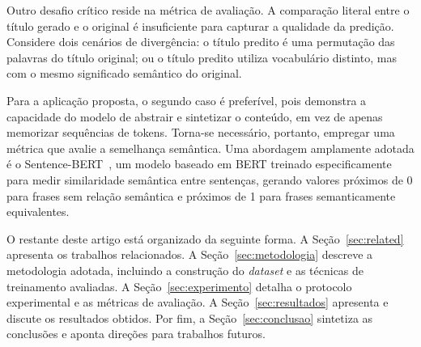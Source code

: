 Outro desafio crítico reside na métrica de avaliação. A comparação literal entre o título gerado e o original é insuficiente para capturar a qualidade da predição. Considere dois cenários de divergência: o título predito é uma permutação das palavras do título original; ou o título predito utiliza vocabulário distinto, mas com o mesmo significado semântico do original.

Para a aplicação proposta, o segundo caso é preferível, pois demonstra a capacidade do modelo de abstrair e sintetizar o conteúdo, em vez de apenas memorizar sequências de tokens. Torna-se necessário, portanto, empregar uma métrica que avalie a semelhança semântica. Uma abordagem amplamente adotada é o Sentence-BERT~\cite{reimers_sentence-bert_2019,devlin_bert_2019}, um modelo baseado em BERT treinado especificamente para medir similaridade semântica entre sentenças, gerando valores próximos de 0 para frases sem relação semântica e próximos de 1 para frases semanticamente equivalentes.

O restante deste artigo está organizado da seguinte forma. A Seção~\ref{sec:related} apresenta os trabalhos relacionados. A Seção~\ref{sec:metodologia} descreve a metodologia adotada, incluindo a construção do \textit{dataset} e as técnicas de treinamento avaliadas. A Seção~\ref{sec:experimento} detalha o protocolo experimental e as métricas de avaliação. A Seção~\ref{sec:resultados} apresenta e discute os resultados obtidos. Por fim, a Seção~\ref{sec:conclusao} sintetiza as conclusões e aponta direções para trabalhos futuros.